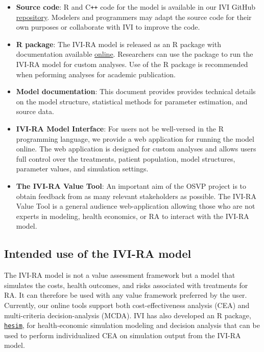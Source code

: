 \documentclass[11pt,final,fleqn]{article}
\theoremstyle{plain}
\newcommand\CPP{{C\texttt{++}}}
\newcommand\R{{\textsf{R}}}
\newcommand{\code}[1]{\texttt{#1}}
\begin{document}
\begin{itemize}
\item \textbf{Source code}: {\R{}} and \CPP{} code for the model is available in our IVI GitHub \href{https://github.com/InnovationValueInitiative/IVI-RA}{repository}. Modelers and programmers may adapt the source code for their own purposes or collaborate with IVI to improve the code. 
\item \textbf{{\R{}} package}: The IVI-RA model is released as an \R{} package with documentation available \href{https://innovationvalueinitiative.github.io/IVI-RA/index.html}{online}. Researchers can use the package to run the IVI-RA model for custom analyses. Use of the {\R{}} package is recommended when peforming analyses for academic publication.
\item \textbf{Model documentation}: This document provides provides technical details on the model structure, statistical methods for parameter estimation, and source data.
\item \textbf{IVI-RA Model Interface}: For users not be well-versed in the {\R{}} programming language, we provide a web application for running the model online. The web application is designed for custom analyses and allows users full control over the treatments, patient population, model structures, parameter values, and simulation settings.  
\item \textbf{The IVI-RA Value Tool}: An important aim of the OSVP project is to obtain feedback from as many relevant stakeholders as possible. The IVI-RA Value Tool is a general audience web-application allowing those who are not experts in modeling, health economics, or RA to interact with the IVI-RA model. 
\end{itemize}

\subsection*{Intended use of the IVI-RA model}
The IVI-RA model is not a value assessment framework but a model that simulates the costs, health outcomes, and risks associated with treatments for RA. It can therefore be used with any value framework preferred by the user. Currently, our online tools support both cost-effectiveness analysis (CEA) and multi-criteria decision-analysis (MCDA). IVI has also developed an R package, \code{\href{https://hesim-dev.github.io/hesim/}{hesim}}, for health-economic simulation modeling and decision analysis that can be used to perform individualized CEA \citep{basu2007value, ioannidis2011individualized, espinoza2014value} on simulation output from the IVI-RA model. 
\end{document}
